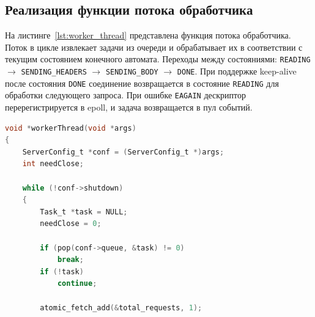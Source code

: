 \subsection{Реализация функции потока обработчика}
На листинге~\ref{lst:worker_thread} представлена функция потока обработчика.
Поток в цикле извлекает задачи из очереди и обрабатывает их
в соответствии с текущим состоянием конечного автомата.
Переходы между состояниями:
\texttt{READING} $\rightarrow$ \texttt{SENDING\_HEADERS} $\rightarrow$ \texttt{SENDING\_BODY} $\rightarrow$ \texttt{DONE}.
При поддержке keep-alive после состояния \texttt{DONE}
соединение возвращается в состояние \texttt{READING}
для обработки следующего запроса.
При ошибке \texttt{EAGAIN} дескриптор перерегистрируется в epoll,
и задача возвращается в пул событий.

\begin{lstlisting}[caption={Реализация функции потока обработчика},label={lst:worker_thread},language=C]
void *workerThread(void *args)
{
    ServerConfig_t *conf = (ServerConfig_t *)args;
    int needClose;

    while (!conf->shutdown)
    {
        Task_t *task = NULL;
        needClose = 0;

        if (pop(conf->queue, &task) != 0)
            break;
        if (!task)
            continue;

        atomic_fetch_add(&total_requests, 1);


\end{lstlisting}
